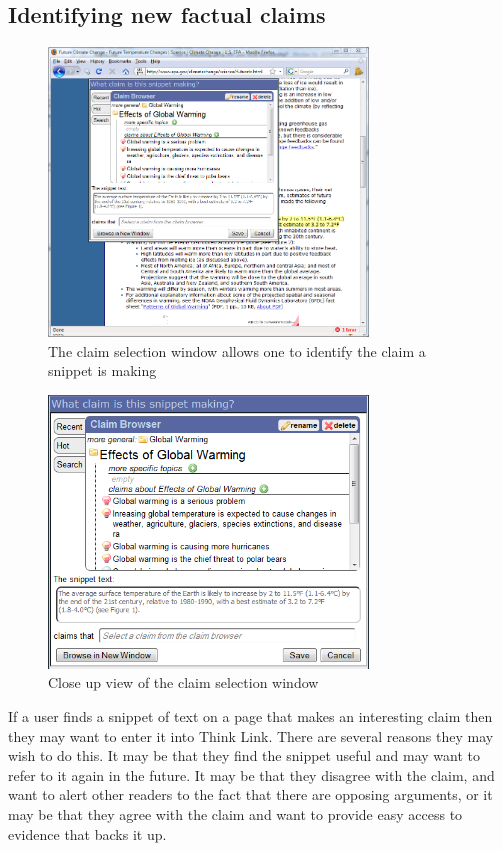 \documentclass{chi2009}
\begin{document}
\subsection{Identifying new factual claims}
\label{newsnippet}

\begin{figure}[t]
	\includegraphics[width=8.5cm]{../screenshots/snipsave_full.png}
	\caption{The claim selection window allows one to identify the claim a snippet is making}
	\label{snipsavefull}
\end{figure}

\begin{figure}[t]
	\includegraphics[width=8.5cm]{../screenshots/snipsave_crop.png}
	\caption{Close up view of the claim selection window}
	\label{snipsavecrop}
\end{figure}


If a user finds a snippet of text on a page that makes an interesting claim then they may want to enter it into Think Link. There are several reasons they may wish to do this. It may be that they find the snippet useful and may want to refer to it again in the future. It may be that they disagree with the claim, and want to alert other readers to the fact that there are opposing arguments, or it may be that they agree with the claim and want to provide easy access to evidence that backs it up. 
\end{document}
